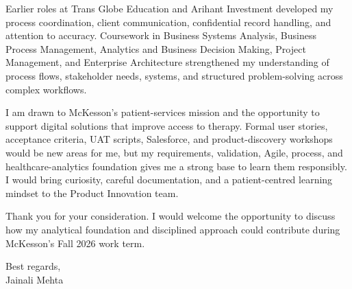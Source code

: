 \documentclass[letterpaper,11pt]{article}
\begin{document}
\bigbreak
Earlier roles at Trans Globe Education and Arihant Investment developed my process coordination, client communication, confidential record handling, and attention to accuracy. Coursework in Business Systems Analysis, Business Process Management, Analytics and Business Decision Making, Project Management, and Enterprise Architecture strengthened my understanding of process flows, stakeholder needs, systems, and structured problem-solving across complex workflows.

\bigbreak
I am drawn to McKesson's patient-services mission and the opportunity to support digital solutions that improve access to therapy. Formal user stories, acceptance criteria, UAT scripts, Salesforce, and product-discovery workshops would be new areas for me, but my requirements, validation, Agile, process, and healthcare-analytics foundation gives me a strong base to learn them responsibly. I would bring curiosity, careful documentation, and a patient-centred learning mindset to the Product Innovation team.

\bigbreak
Thank you for your consideration. I would welcome the opportunity to discuss how my analytical foundation and disciplined approach could contribute during McKesson's Fall 2026 work term.

\bigbreak
Best regards,\\
Jainali Mehta
\end{document}
